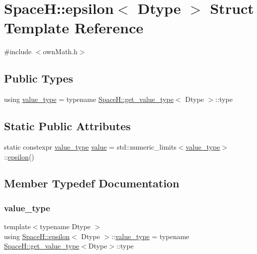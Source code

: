 \hypertarget{struct_space_h_1_1epsilon}{}\section{SpaceH\+:\+:epsilon$<$ Dtype $>$ Struct Template Reference}
\label{struct_space_h_1_1epsilon}


{\ttfamily \#include $<$own\+Math.\+h$>$}

\subsection*{Public Types}
\begin{DoxyCompactItemize}
\item 
using \mbox{\hyperlink{struct_space_h_1_1epsilon_abd3cad02e7f97ff8ed6b20b67c2ff1fc}{value\+\_\+type}} = typename \mbox{\hyperlink{struct_space_h_1_1get__value__type}{Space\+H\+::get\+\_\+value\+\_\+type}}$<$ Dtype $>$\+::type
\end{DoxyCompactItemize}
\subsection*{Static Public Attributes}
\begin{DoxyCompactItemize}
\item 
static constexpr \mbox{\hyperlink{struct_space_h_1_1epsilon_abd3cad02e7f97ff8ed6b20b67c2ff1fc}{value\+\_\+type}} \mbox{\hyperlink{struct_space_h_1_1epsilon_ac5843bdc3a64016722e87809ead426bb}{value}} = std\+::numeric\+\_\+limits$<$\mbox{\hyperlink{struct_space_h_1_1epsilon_abd3cad02e7f97ff8ed6b20b67c2ff1fc}{value\+\_\+type}}$>$\+::\mbox{\hyperlink{struct_space_h_1_1epsilon}{epsilon}}()
\end{DoxyCompactItemize}


\subsection{Member Typedef Documentation}
\mbox{\label{struct_space_h_1_1epsilon_abd3cad02e7f97ff8ed6b20b67c2ff1fc}} 
\subsubsection{\texorpdfstring{value\+\_\+type}{value\_type}}
{\footnotesize\ttfamily template$<$typename Dtype $>$ \\
using \mbox{\hyperlink{struct_space_h_1_1epsilon}{Space\+H\+::epsilon}}$<$ Dtype $>$\+::\mbox{\hyperlink{struct_space_h_1_1epsilon_abd3cad02e7f97ff8ed6b20b67c2ff1fc}{value\+\_\+type}} =  typename \mbox{\hyperlink{struct_space_h_1_1get__value__type}{Space\+H\+::get\+\_\+value\+\_\+type}}$<$Dtype$>$\+::type}



